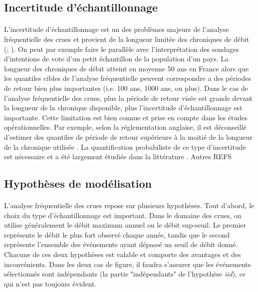 \documentclass[11pt]{article}
\begin{document}
	\subsection{Incertitude d'échantillonnage}
	
	\paragraph{} L'incertitude d'échantillonnage est un des problèmes majeurs de l'analyse fréquentielle des crues et provient de la longueur limitée des chroniques de débit (\citet{apel_flood_2004}; \citet{kjeldsen_uncertainty_2011}). On peut par exemple faire le parallèle avec l'interprétation des sondages d'intentions de vote d'un petit échantillon de la population d'un pays. La longueur des chroniques de débit atteint en moyenne 50 ans en France \citep{le_coz_quantifying_2017} alors que les quantiles cibles de l'analyse fréquentielle peuvent correspondre a des périodes de retour bien plus importantes (i.e. 100 ans, 1000 ans, ou plus). Dans le cas de l'analyse fréquentielle des crues, plus la période de retour visée est grande devant la longueur de la chronique disponible, plus l'incertitude d'échantillonnage est importante. Cette limitation est bien connue et prise en compte dans les études opérationnelles. Par exemple, selon la réglementation anglaise, il est déconseillé d'estimer des quantiles de période de retour supérieure à la moitié de la longueur de la chronique utilisée \citep{whs_flood_2008}. La quantification probabiliste de ce type d'incertitude est nécessaire et a été largement étudiée dans la littérature \citep{renard_application_2006}. Autres REFS
	
	\subsection{Hypothèses de modélisation}
		
	\paragraph{} L'analyse fréquentielle des crues repose sur plusieurs hypothèses. Tout d'abord, le choix du type d'échantillonnage est important. Dans le domaine des crues, on utilise généralement le débit maximum annuel ou le débit sup-seuil. Le premier représente le débit le plus fort observé chaque année, tandis que le second représente l'ensemble des événements ayant dépassé un seuil de débit donné. Chacune de ces deux hypothèses est valable et comporte des avantages et des inconvénients. Dans les deux cas de figure, il faudra s'assurer que les événements sélectionnés sont indépendants (la partie "indépendants" de l'hypothèse \textit{iid}), ce qui n'est pas toujours évident.
	
\end{document}
